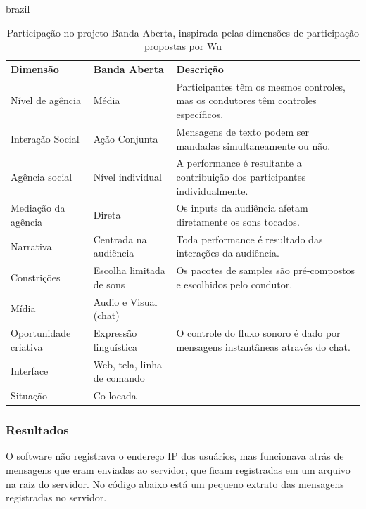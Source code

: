 \begin{otherlanguage*}{brazil}
\begin{table}[ht!]
\ABNTEXfontereduzida
\setlength\extrarowheight{-2pt}
\caption{Participação no projeto Banda Aberta, inspirada pelas dimensões de participação propostas por Wu \cite{wu2017open}}{%
\begin{tabular}{p{3cm}p{3cm}p{4cm}}
\hline
\textbf{Dimensão } & \textbf{Banda Aberta} & \textbf{Descrição} \\
Nível de agência & Média & Participantes têm os mesmos controles, mas os condutores têm controles específicos.\\
Interação Social & Ação Conjunta & Mensagens de texto podem ser mandadas simultaneamente ou não.\\
Agência social  & Nível individual & A performance é resultante a contribuição dos participantes individualmente.\\
Mediação da agência & Direta & Os inputs da audiência afetam diretamente os sons tocados. \\
Narrativa & Centrada na audiência & Toda performance é resultado das interações da audiência.\\
Constrições & Escolha limitada de sons & Os pacotes de samples são pré-compostos e escolhidos pelo condutor.\\
Mídia & Audio e Visual (chat) & \\
Oportunidade criativa & Expressão linguística & O controle do fluxo sonoro é dado por mensagens instantâneas através do chat.\\
Interface & Web, tela, linha de comando & \\
Situação & Co-locada & \\
\hline
\end{tabular}}
\label{tab:participation}
\end{table}

\newpage

\subsubsection{Resultados}

O software não registrava o endereço IP dos usuários, mas funcionava atrás de mensagens que eram enviadas ao servidor, que ficam registradas em um arquivo na raiz do servidor. No código abaixo está um pequeno extrato das mensagens registradas no servidor. 


\begin{verbatim}


\end{verbatim}
\end{otherlanguage*}
